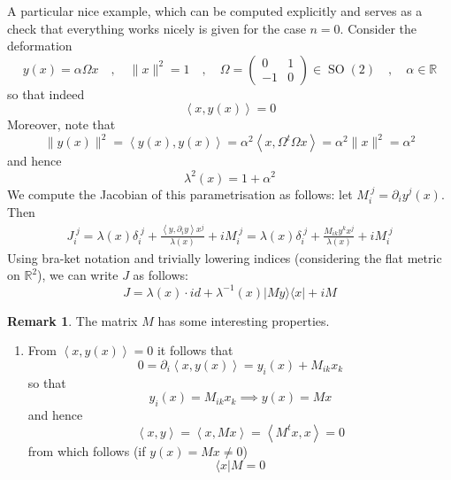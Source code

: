 \documentclass[a4paper,11pt]{article}
\theoremstyle{definition}
\newtheorem{remark}{Remark}
\newcommand{\RR}{\mathbb{R}}
\DeclareMathOperator{\SO}{SO}
\newcommand{\del}{\partial}
\newcommand{\ket}[1]{\lvert #1 \rangle}
\newcommand{\bra}[1]{\langle #1 \rvert}
\newcommand{\mat}[4]{\begin{pmatrix} #1 & #2 \\ #3 & #4 \end{pmatrix}}
\begin{document}
A particular nice example, which can be computed explicitly and serves as a check that everything works nicely is given for the case $n=0$.
Consider the deformation 
\begin{equation}
  y(x) = \alpha \Omega x \quad , \quad \lVert x \rVert^2 = 1\quad , \quad \Omega = \mat{0}{1}{-1}{0} \in \SO(2) \quad , \quad \alpha \in \RR
  \label{eq:toy_cst_def}
\end{equation}
so that indeed 
\begin{equation}
  \left\langle x, y(x) \right\rangle = 0
\end{equation}
Moreover, note that 
\begin{equation}
  \lVert y(x) \rVert^2 = \left\langle y(x), y(x) \right\rangle = \alpha^2 \left\langle x, \Omega^t \Omega x \right\rangle = \alpha^2 \lVert x \rVert^2 = \alpha^2
\end{equation}
and hence 
\begin{equation}
  \lambda^2(x) = 1 + \alpha^2
\end{equation}
We compute the Jacobian of this parametrisation as follows: let $M_{i}^{\;j} = \del_i y^j(x)$.
Then 
\begin{equation}
  \begin{split} 
    J_i^{\;j} = \lambda(x) \delta_{i}^{\;j} + \frac{\left\langle y, \del_i y \right\rangle x^j}{\lambda(x)} + i M_i^{\;j} =  \lambda(x) \delta_{i}^{\;j} + \frac{M_{ik}y^k x^j}{\lambda(x)} + i M_i^{\;j}
  \end{split}
\end{equation}
Using bra-ket notation and trivially lowering indices (considering the flat metric on $\RR^2$), we can write $J$ as follows:
\begin{equation}
  J = \lambda(x) \cdot id + \lambda^{-1}(x) \ket{My}\bra{x} + i M
\end{equation}
\begin{remark}
  The matrix $M$ has some interesting properties.
  \begin{enumerate}
    \item From $\left\langle x, y(x) \right\rangle = 0$ it follows that
      \[
      0 = \del_i \left\langle x, y(x) \right\rangle = y_i(x) + M_{ik} x_k
      \] 
      so that 
      \[
	y_i(x) = M_{ik} x_k \implies y(x) = Mx
      \] 
      and hence
      \[
	\left\langle x, y \right\rangle = \left\langle x , Mx \right\rangle = \left\langle M^t x, x \right\rangle = 0
      \] 
      from which follows (if $y(x) = Mx \neq 0$)
      \[
	\bra{x} M = 0
      \] 
  \end{enumerate}
\end{remark}
\end{document}
